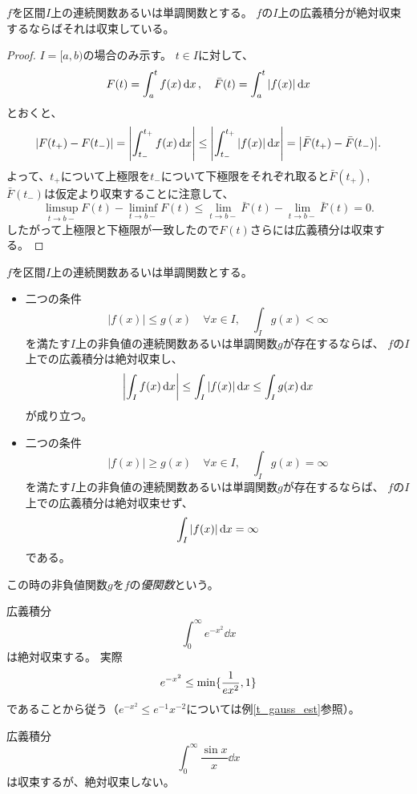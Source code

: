 \begin{proposition}
$f$を区間$I$上の連続関数あるいは単調関数とする。
$f$の$I$上の広義積分が絶対収束するならばそれは収束している。
\end{proposition}

\begin{proof}
$I = [a, b)$の場合のみ示す。
$t \in I$に対して、
$$
F(t) = \int_a^t f(x)\dd{x},
\quad \bar{F}(t) = \int_a^t \abs{f(x)}\dd{x}
$$
とおくと、
$$
\abs{F(t_+)-F(t_-)} = \abs{\int_{t_-}^{t_+} f(x)\dd{x}} \le \abs{\int_{t_-}^{t_+} \abs{f(x)}\dd{x}} = \abs{\bar{F}(t_+)-\bar{F}(t_-)}.
$$
よって、$t_+$について上極限を$t_-$について下極限をそれぞれ取ると$\bar{F}(t_+)$, $\bar{F}(t_-)$は仮定より収束することに注意して、
$$
\limsup_{t \to b-}F(t)-\liminf_{t \to b-}F(t) \le \lim_{t \to b-}\bar{F}(t)-\lim_{t \to b-}\bar{F}(t) = 0.
$$
したがって上極限と下極限が一致したので$F(t)$さらには広義積分は収束する。
\end{proof}

\begin{proposition}[広義積分の比較判定法]
$f$を区間$I$上の連続関数あるいは単調関数とする。
\begin{itemize}
\item
二つの条件
$$
|f(x)| \le g(x) \quad \forall x \in I,
\quad \int_I g(x) < \infty
$$
を満たす$I$上の非負値の連続関数あるいは単調関数$g$が存在するならば、
$f$の$I$上での広義積分は絶対収束し、
$$
\abs{\int_I f(x)\dd{x}} \le \int_I \abs{f(x)}\dd{x} \le \int_I g(x)\dd{x}
$$
が成り立つ。
\item
二つの条件
$$
|f(x)| \ge g(x) \quad \forall x \in I,
\quad \int_I g(x) = \infty
$$
を満たす$I$上の非負値の連続関数あるいは単調関数$g$が存在するならば、
$f$の$I$上での広義積分は絶対収束せず、
$$
\int_I \abs{f(x)}\dd{x} = \infty
$$
である。
\end{itemize}
\end{proposition}

\begin{remark}
この時の非負値関数$g$を$f$の\emph{優関数}という。
\end{remark}

\begin{example}
広義積分
$$
\int_0^\infty e^{-x^2}\dd{x}
$$
は絶対収束する。
実際
$$
e^{-x^2} \le \min\{ \frac{1}{e x^2}, 1 \}
$$
であることから従う（$e^{-x^2} \le e^{-1}x^{-2}$については例\ref{t_gauss_est}参照）。
\end{example}

\begin{example}
広義積分
$$
\int_0^\infty \frac{\sin x}{x}\dd{x}
$$
は収束するが、絶対収束しない。
\end{example}
